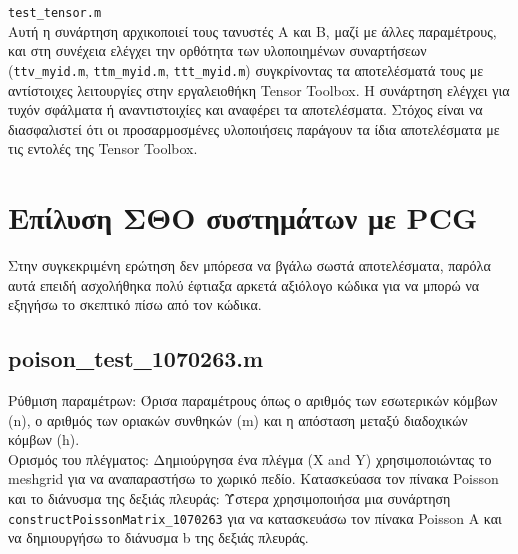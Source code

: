 \documentclass[12pt,a4paper]{article}
\begin{document}
\texttt{test\_tensor.m} \\

Αυτή η συνάρτηση αρχικοποιεί τους τανυστές A και B, μαζί με άλλες παραμέτρους, και στη συνέχεια ελέγχει την ορθότητα των υλοποιημένων συναρτήσεων (\texttt{ttv\_myid.m}, \texttt{ttm\_myid.m}, \texttt{ttt\_myid.m}) συγκρίνοντας τα αποτελέσματά τους με αντίστοιχες λειτουργίες στην εργαλειοθήκη Tensor Toolbox. H συνάρτηση ελέγχει για τυχόν σφάλματα ή αναντιστοιχίες και αναφέρει τα αποτελέσματα. Στόχος είναι να διασφαλιστεί ότι οι προσαρμοσμένες υλοποιήσεις παράγουν τα ίδια αποτελέσματα με τις εντολές της Tensor Toolbox.


\section{Επίλυση ΣΘΟ συστημάτων με PCG}
Στην συγκεκριμένη ερώτηση δεν μπόρεσα να βγάλω σωστά αποτελέσματα, παρόλα αυτά επειδή ασχολήθηκα πολύ έφτιαξα αρκετά αξιόλογο κώδικα για να μπορώ να εξηγήσω το σκεπτικό πίσω από τον κώδικα.
\subsection{poison\_test\_1070263.m}
Ρύθμιση παραμέτρων: Όρισα παραμέτρους όπως ο αριθμός των εσωτερικών κόμβων (n), ο αριθμός των οριακών συνθηκών (m) και η απόσταση μεταξύ διαδοχικών κόμβων (h).\\
Ορισμός του πλέγματος: Δημιούργησα ένα πλέγμα (X and Y) χρησιμοποιώντας το meshgrid για να αναπαραστήσω το χωρικό πεδίο.
Κατασκεύασα τον πίνακα Poisson και το διάνυσμα της δεξιάς πλευράς: Ύστερα χρησιμοποιήσα μια συνάρτηση  \texttt{constructPoissonMatrix\_1070263}  για να κατασκευάσω τον πίνακα Poisson A και να δημιουργήσω το διάνυσμα b της δεξιάς πλευράς.\\
\end{document}
